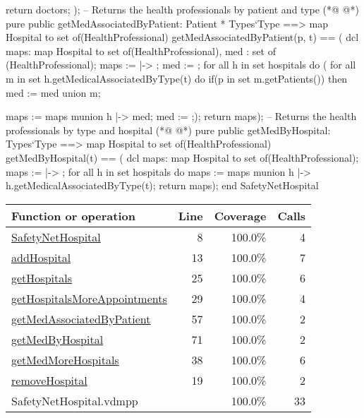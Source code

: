 \begin{vdmpp}[breaklines=true]
                  return doctors;
                 );
 -- Returns the health professionals by patient and type                              
(*@
\label{getMedAssociatedByPatient:57}
@*)
 pure public getMedAssociatedByPatient: Patient * Types`Type ==> map Hospital to set of(HealthProfessional)
  getMedAssociatedByPatient(p, t) == (
                     dcl maps: map Hospital to set of(HealthProfessional), med : set of (HealthProfessional);
                     maps := { |-> };
                     med := {};
                     for all h in set hospitals do (
                      for all m in set h.getMedicalAssociatedByType(t) do
                       if(p in set m.getPatients())
                        then med := med union {m};
                       
                      maps := maps munion {h |-> med};
                      med := {};);
                      return maps);
 -- Returns the health professionals by type and hospital
(*@
\label{getMedByHospital:71}
@*)
 pure public getMedByHospital: Types`Type ==> map Hospital to set of(HealthProfessional)
  getMedByHospital(t) == (
                     dcl maps: map Hospital to set of(HealthProfessional);
                     maps := { |-> };
                     for all h in set hospitals do
                      maps := maps munion {h |-> h.getMedicalAssociatedByType(t)};
                     return maps);
end SafetyNetHospital
\end{vdmpp}
\bigskip
\begin{longtable}{|l|r|r|r|}
\hline
Function or operation & Line & Coverage & Calls \\
\hline
\hline
\hyperref[SafetyNetHospital:8]{SafetyNetHospital} & 8&100.0\% & 4 \\
\hline
\hyperref[addHospital:13]{addHospital} & 13&100.0\% & 7 \\
\hline
\hyperref[getHospitals:25]{getHospitals} & 25&100.0\% & 6 \\
\hline
\hyperref[getHospitalsMoreAppointments:29]{getHospitalsMoreAppointments} & 29&100.0\% & 4 \\
\hline
\hyperref[getMedAssociatedByPatient:57]{getMedAssociatedByPatient} & 57&100.0\% & 2 \\
\hline
\hyperref[getMedByHospital:71]{getMedByHospital} & 71&100.0\% & 2 \\
\hline
\hyperref[getMedMoreHospitals:38]{getMedMoreHospitals} & 38&100.0\% & 6 \\
\hline
\hyperref[removeHospital:19]{removeHospital} & 19&100.0\% & 2 \\
\hline
\hline
SafetyNetHospital.vdmpp & & 100.0\% & 33 \\
\hline
\end{longtable}

